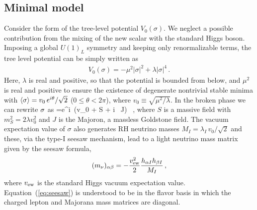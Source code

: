 \documentclass[a4paper,11pt]{article}
\begin{document}
\subsection{Minimal model}

Consider the form of the tree-level potential $V_0(\sigma)$.  We neglect
a possible contribution from the mixing of the new scalar with the standard Higgs boson.
Imposing a global $U(1)_L$ symmetry and keeping only renormalizable terms, 
the tree level potential can be simply written as
\begin{eqnarray} \label{eq:V_L}
V_0(\sigma) = - \mu^2 |\sigma|^2 + \lambda |\sigma|^4 \, .
\end{eqnarray}
Here, $\lambda$ is real and positive, so that the potential is bounded from below, and  $\mu^2$ is real and positive
to ensure  the existence of degenerate nontrivial stable minima
with  $\langle \sigma \rangle   = v_0\,e^{i\theta}/\sqrt{2}$ ($0\leq \theta < 2\pi$), where $v_0 \equiv \sqrt{\mu^2/\lambda}$.  %
In the broken phase we can rewrite $\sigma$ as
\be\label{sigma}
\sigma ={e^{i\theta} \over {}}\,(v_0 +  S + i \, J) \,  ,
\ee 
where  $S$ is a massive  field with $m_S^2= 2 \lambda v_0^2$ 
and $J$ is  the Majoron, a massless Goldstone field. 
The vacuum expectation value of $\sigma$ also generates RH neutrino masses $M_I = \lambda_I \, v_0/\sqrt{2}$ and these, via
the type-I seesaw mechanism, lead to a light neutrino mass matrix given by the seesaw formula, %
\begin{eqnarray} \label{eq:seesaw}
(m_\nu)_{\alpha\beta} = - {v_{\rm ew}^2 \over 2}{h_{\alpha I} h_{\beta I} \over M_I} \, ,
\end{eqnarray}
where $v_{\rm ew}$ is the standard Higgs vacuum expectation value. Equation~(\ref{eq:seesaw}) is understood to be in the flavor basis
in which the charged lepton and Majorana mass matrices are diagonal.
\end{document}
